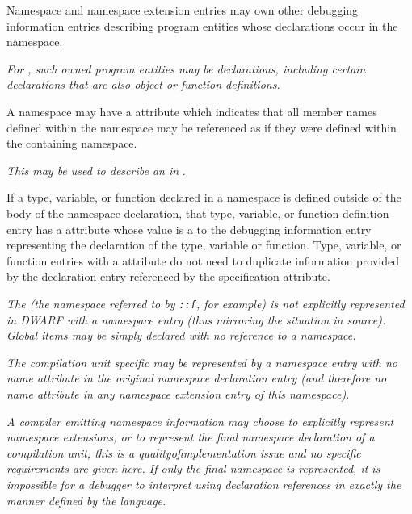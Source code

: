 Namespace and namespace extension entries may own 
other
debugging information entries describing program entities
whose declarations occur in the namespace.

\textit{For , such 
owned program entities may be declarations,
including certain declarations that are also object or
function definitions.}

A namespace may have a 
\DWATexportsymbolsDEFN{}
attribute
which indicates that all member names defined within the 
namespace may be referenced as if they were defined within 
the containing namespace. 

\textit{This may be used to describe an  in }.

If a type, variable, or function declared in a namespace is
defined outside of the body of the namespace declaration,
that type, variable, or function definition entry has a
\DWATspecification{} attribute 
whose value is a  to the
debugging information entry representing the declaration of
the type, variable or function. Type, variable, or function
entries with a 
\DWATspecification{} attribute 
do not need
to duplicate information provided by the declaration entry
referenced by the specification attribute.

\textit{The  
(the 
namespace 
referred to by
\texttt{::f}, for example) is not explicitly represented in
DWARF with a namespace entry (thus mirroring the situation
in  source).  
Global items may be simply declared with no
reference to a namespace.}

\textit{The  
compilation unit specific  may
be represented by a namespace entry with no name attribute in
the original namespace declaration entry (and therefore no name
attribute in any namespace extension entry of this namespace).
}

\textit{A compiler emitting namespace information may choose to
explicitly represent namespace extensions, or to represent the
final namespace declaration of a compilation unit; this is a
quality\dash of\dash implementation issue and no specific requirements
are given here. If only the final namespace is represented,
it is impossible for a debugger to interpret using declaration
references in exactly the manner defined by the 
 language.
}

